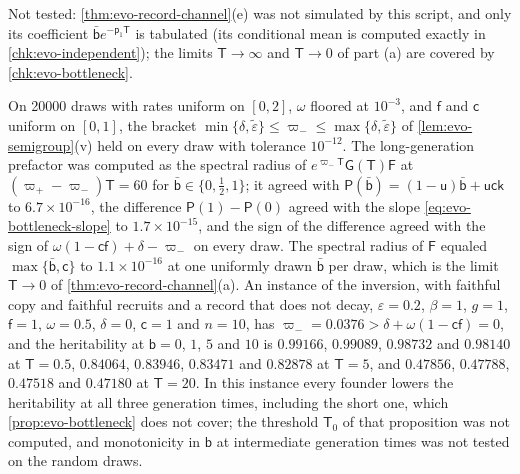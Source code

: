\begin{numcheck}
Not tested: \cref{thm:evo-record-channel}(e) was not simulated by this script, and only its coefficient $\bar{\mathsf b}e^{-\mathsf p_1\mathsf T}$ is tabulated (its conditional mean is computed exactly in \cref{chk:evo-independent}); the limits $\mathsf T\to\infty$ and $\mathsf T\to0$ of part (a) are covered by \cref{chk:evo-bottleneck}.
\end{numcheck}

\begin{numcheck}\label{chk:evo-bottleneck}
On 20000 draws with rates uniform on $[0,2]$, $\omega$ floored at $10^{-3}$, and $\mathsf f$ and $\mathsf c$ uniform on $[0,1]$, the bracket $\min\{\delta,\tilde\varepsilon\}\le\varpi_-\le\max\{\delta,\tilde\varepsilon\}$ of \cref{lem:evo-semigroup}(v) held on every draw with tolerance $10^{-12}$. The long-generation prefactor was computed as the spectral radius of $e^{\varpi_-\mathsf T}\mathsf G(\mathsf T)\mathsf F$ at $(\varpi_+-\varpi_-)\mathsf T=60$ for $\bar{\mathsf b}\in\{0,\frac12,1\}$; it agreed with $\mathsf P(\bar{\mathsf b})=(1-\mathsf u)\bar{\mathsf b}+\mathsf u\mathsf c\mathsf k$ to $6.7\times10^{-16}$, the difference $\mathsf P(1)-\mathsf P(0)$ agreed with the slope \eqref{eq:evo-bottleneck-slope} to $1.7\times10^{-15}$, and the sign of the difference agreed with the sign of $\omega(1-\mathsf c\mathsf f)+\delta-\varpi_-$ on every draw. The spectral radius of $\mathsf F$ equaled $\max\{\bar{\mathsf b},\mathsf c\}$ to $1.1\times10^{-16}$ at one uniformly drawn $\bar{\mathsf b}$ per draw, which is the limit $\mathsf T\to0$ of \cref{thm:evo-record-channel}(a). An instance of the inversion, with faithful copy and faithful recruits and a record that does not decay, $\varepsilon=0.2$, $\beta=1$, $g=1$, $\mathsf f=1$, $\omega=0.5$, $\delta=0$, $\mathsf c=1$ and $n=10$, has $\varpi_-=0.0376>\delta+\omega(1-\mathsf c\mathsf f)=0$, and the heritability at $\mathsf b=0$, $1$, $5$ and $10$ is $0.99166$, $0.99089$, $0.98732$ and $0.98140$ at $\mathsf T=0.5$, $0.84064$, $0.83946$, $0.83471$ and $0.82878$ at $\mathsf T=5$, and $0.47856$, $0.47788$, $0.47518$ and $0.47180$ at $\mathsf T=20$. In this instance every founder lowers the heritability at all three generation times, including the short one, which \cref{prop:evo-bottleneck} does not cover; the threshold $\mathsf T_0$ of that proposition was not computed, and monotonicity in $\mathsf b$ at intermediate generation times was not tested on the random draws.
\end{numcheck}

